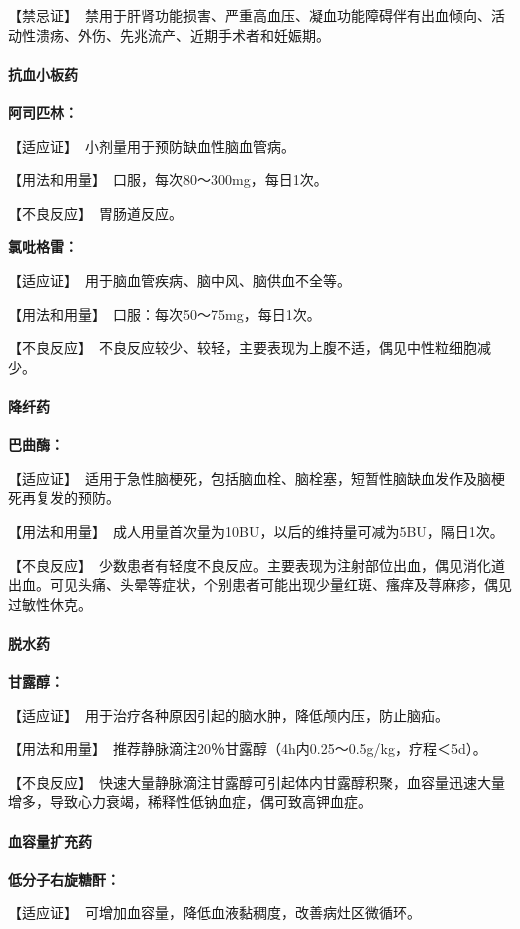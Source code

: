 【禁忌证】　禁用于肝肾功能损害、严重高血压、凝血功能障碍伴有出血倾向、活动性溃疡、外伤、先兆流产、近期手术者和妊娠期。
\paragraph{抗血小板药}

\textbf{阿司匹林：}

【适应证】　小剂量用于预防缺血性脑血管病。

【用法和用量】　口服，每次80～300mg，每日1次。

【不良反应】　胃肠道反应。

\textbf{氯吡格雷：}

【适应证】　用于脑血管疾病、脑中风、脑供血不全等。

【用法和用量】　口服：每次50～75mg，每日1次。

【不良反应】　不良反应较少、较轻，主要表现为上腹不适，偶见中性粒细胞减少。
\paragraph{降纤药}

\textbf{巴曲酶：}

【适应证】　适用于急性脑梗死，包括脑血栓、脑栓塞，短暂性脑缺血发作及脑梗死再复发的预防。

【用法和用量】　成人用量首次量为10BU，以后的维持量可减为5BU，隔日1次。

【不良反应】　少数患者有轻度不良反应。主要表现为注射部位出血，偶见消化道出血。可见头痛、头晕等症状，个别患者可能出现少量红斑、瘙痒及荨麻疹，偶见过敏性休克。
\paragraph{脱水药}

\textbf{甘露醇：}

【适应证】　用于治疗各种原因引起的脑水肿，降低颅内压，防止脑疝。

【用法和用量】　推荐静脉滴注20％甘露醇（4h内0.25～0.5g/kg，疗程＜5d）。

【不良反应】　快速大量静脉滴注甘露醇可引起体内甘露醇积聚，血容量迅速大量增多，导致心力衰竭，稀释性低钠血症，偶可致高钾血症。
\paragraph{血容量扩充药}

\textbf{低分子右旋糖酐：}

【适应证】　可增加血容量，降低血液黏稠度，改善病灶区微循环。

